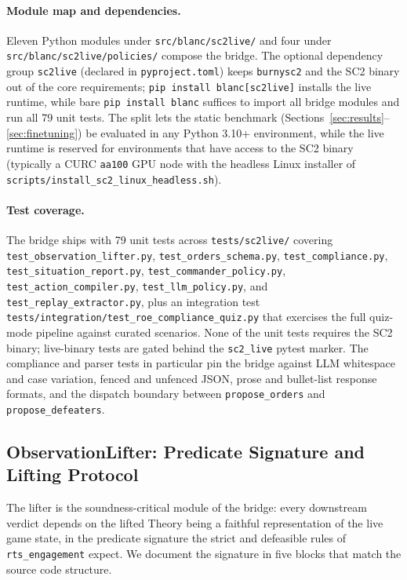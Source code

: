 \documentclass{article}
\theoremstyle{definition}
\begin{document}
\paragraph{Module map and dependencies.} Eleven Python modules under \texttt{src/blanc/sc2live/} and four under \texttt{src/blanc/sc2live/policies/} compose the bridge. The optional dependency group \texttt{sc2live} (declared in \texttt{pyproject.toml}) keeps \texttt{burnysc2} and the SC2 binary out of the core requirements; \texttt{pip install blanc[sc2live]} installs the live runtime, while bare \texttt{pip install blanc} suffices to import all bridge modules and run all 79 unit tests. The split lets the static benchmark (Sections~\ref{sec:results}--\ref{sec:finetuning}) be evaluated in any Python 3.10+ environment, while the live runtime is reserved for environments that have access to the SC2 binary (typically a CURC \texttt{aa100} GPU node with the headless Linux installer of \texttt{scripts/install\_sc2\_linux\_headless.sh}).

\paragraph{Test coverage.} The bridge ships with 79 unit tests across \texttt{tests/sc2live/} covering \texttt{test\_observation\_lifter.py}, \texttt{test\_orders\_schema.py}, \texttt{test\_compliance.py}, \texttt{test\_situation\_report.py}, \texttt{test\_commander\_policy.py}, \texttt{test\_action\_compiler.py}, \texttt{test\_llm\_policy.py}, and \texttt{test\_replay\_extractor.py}, plus an integration test \texttt{tests/integration/test\_roe\_compliance\_quiz.py} that exercises the full quiz-mode pipeline against curated scenarios. None of the unit tests requires the SC2 binary; live-binary tests are gated behind the \texttt{sc2\_live} pytest marker. The compliance and parser tests in particular pin the bridge against LLM whitespace and case variation, fenced and unfenced JSON, prose and bullet-list response formats, and the dispatch boundary between \texttt{propose\_orders} and \texttt{propose\_defeaters}.


\subsection{ObservationLifter: Predicate Signature and Lifting Protocol}\label{subsec:sc2live-lifter}

The lifter is the soundness-critical module of the bridge: every downstream verdict depends on the lifted Theory being a faithful representation of the live game state, in the predicate signature the strict and defeasible rules of \texttt{rts\_engagement} expect. We document the signature in five blocks that match the source code structure.
\end{document}
